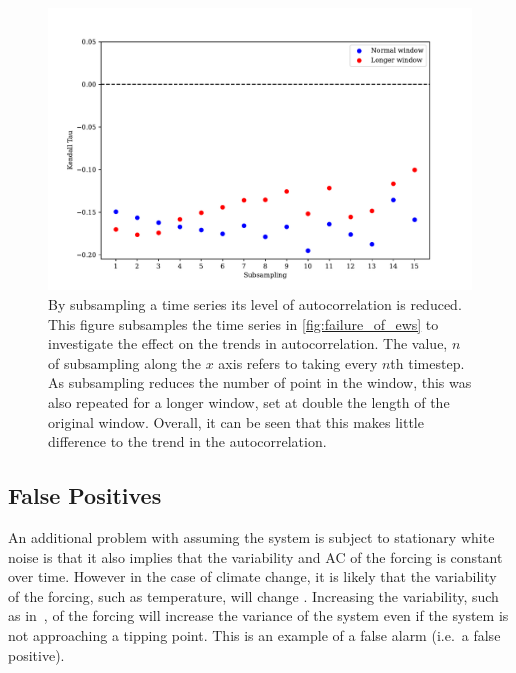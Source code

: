 \begin{figure}
  \centering
  \includegraphics[width=\textwidth]{subsampling}
  \caption[Effect of Subsampling]{By subsampling a time series its level of autocorrelation is reduced. This figure subsamples the time series in
    \cref{fig:failure_of_ews} to investigate the effect on the trends in autocorrelation. The value, $n$ of subsampling along the $x$ axis refers to taking
    every $n$th timestep. As subsampling reduces the number of point in the window, this was also repeated for a longer window, set at double the length of the
  original window. Overall, it can be seen that this makes little difference to the trend in the autocorrelation.}
  \label{fig:subsampling}
\end{figure}


\subsection{False Positives}
An additional problem with assuming the system is subject to stationary white noise is that it also implies that the
variability and AC of the forcing is constant over time. 
However in the case of 
climate change, it is likely that the variability of the forcing,
such as temperature, will change \parencite{Huntingford2013}. 
Increasing the variability, such as in~\cite{Boers2021a}, of the forcing will increase the variance of the system even
if the system is not approaching a tipping point. This is an example of a false
alarm (i.e.\ a false positive). 

